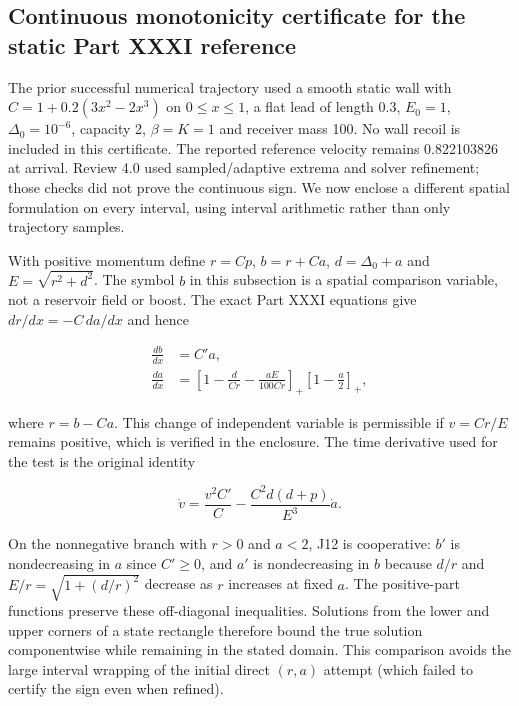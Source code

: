 \documentclass[
  11pt,
  twoside]{article}
\begin{document}
\subsection{Continuous monotonicity certificate for the static Part XXXI
reference}\label{continuous-monotonicity-certificate-for-the-static-part-xxxi-reference}

The prior successful numerical trajectory used a smooth static wall with
\(C=1+0.2(3x^2-2x^3)\) on \(0\leq x\leq1\), a flat lead of length 0.3,
\(E_0=1\), \(\Delta_0=10^{-6}\), capacity 2, \(\beta=K=1\) and receiver
mass 100. No wall recoil is included in this certificate. The reported
reference velocity remains 0.822103826 at arrival. Review 4.0 used
sampled/adaptive extrema and solver refinement; those checks did not
prove the continuous sign. We now enclose a different spatial
formulation on every interval, using interval arithmetic rather than
only trajectory samples.

With positive momentum define \(r=Cp\), \(b=r+Ca\), \(d=\Delta_0+a\) and
\(E=\sqrt{r^2+d^2}\). The symbol \(b\) in this subsection is a spatial
comparison variable, not a reservoir field or boost. The exact Part XXXI
equations give \(dr/dx=-C\,da/dx\) and hence

\[\begin{aligned}
\frac{db}{dx}&=C'a,\\
\frac{da}{dx}&=\left[1-\frac{d}{Cr}-\frac{aE}{100Cr}\right]_+
\left[1-\frac{a}{2}\right]_+,
\end{aligned}\tag{J12}\]

where \(r=b-Ca\). This change of independent variable is permissible if
\(v=Cr/E\) remains positive, which is verified in the enclosure. The
time derivative used for the test is the original identity

\[\dot v=\frac{v^2 C'}{C}-\frac{C^2d(d+p)}{E^3}\dot a.\tag{J13}\]

On the nonnegative branch with \(r>0\) and \(a<2\), J12 is cooperative:
\(b'\) is nondecreasing in \(a\) since \(C'\geq0\), and \(a'\) is
nondecreasing in \(b\) because \(d/r\) and \(E/r=\sqrt{1+(d/r)^2}\)
decrease as \(r\) increases at fixed \(a\). The positive-part functions
preserve these off-diagonal inequalities. Solutions from the lower and
upper corners of a state rectangle therefore bound the true solution
componentwise while remaining in the stated domain. This comparison
avoids the large interval wrapping of the initial direct \((r,a)\)
attempt (which failed to certify the sign even when refined).
\end{document}
